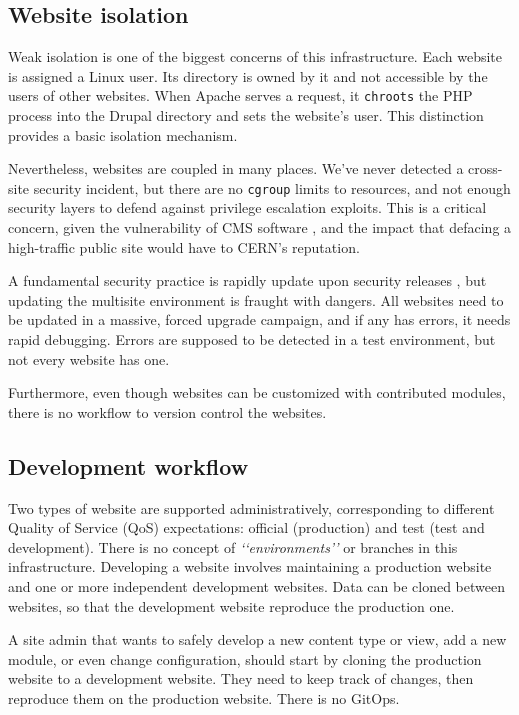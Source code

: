 \subsection{Website isolation}

Weak isolation is one of the biggest concerns of this infrastructure.
Each website is assigned a Linux user.
Its directory is owned by it and not accessible by the users of other websites.
When Apache serves a request, it \texttt{chroots} the PHP process into the Drupal directory and sets the website's user.
This distinction provides a basic isolation mechanism.

Nevertheless, websites are coupled in many places.
We've never detected a cross-site security incident,
but there are no \texttt{cgroup} limits to resources, and not enough security layers to defend against privilege escalation exploits.
This is a critical concern, given the vulnerability of CMS software \cite{shteiman_why_2014},
and the impact that defacing a high-traffic public site would have to CERN's reputation.

A fundamental security practice is rapidly update upon security releases \cite{csontos_accessibility_2020},
but updating the multisite environment is fraught with dangers.
All websites need to be updated in a massive, forced upgrade campaign, and if any has errors, it needs rapid debugging.
Errors are supposed to be detected in a test environment, but not every website has one.

Furthermore, even though websites can be customized with contributed modules, there is no workflow to version control the websites.

\subsection{Development workflow}

Two types of website are supported administratively, corresponding to different Quality of Service (QoS) expectations: official (production) and test (test and development).
There is no concept of \emph{\lq\lq environments\rq\rq} or branches in this infrastructure. Developing a website involves maintaining a production website and one or more independent development websites.
Data can be cloned between websites, so that the development website reproduce the production one.

A site admin that wants to safely develop a new content type or view, add a new module, or even change configuration, should start by cloning the production website to a development website.
They need to keep track of changes, then reproduce them on the production website.
There is no GitOps.

